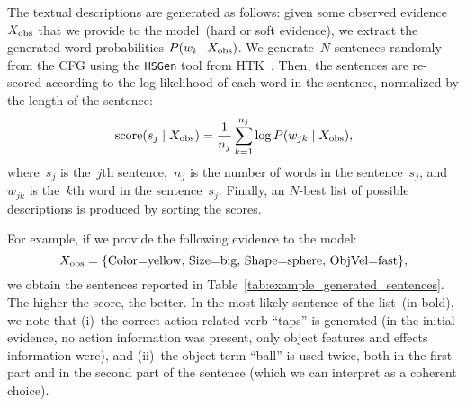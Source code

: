 The textual descriptions are generated as follows: given some observed evidence~$X_\text{obs}$ that we provide to the model~(hard or soft evidence), we extract the generated word probabilities
$P(w_i \mid X_\text{obs})$.
We generate~$N$ sentences randomly from the \ac{CFG} using the \texttt{HSGen} tool from HTK~\cite{young:htkbook}.
Then, the sentences are re-scored according to the log-likelihood of each word in the sentence, normalized by the length of the sentence:
\begin{equation} \label{eq:sentence_score}
  \text{score}(s_j \given \xobs) = \frac{1}{n_j} \sum_{k=1}^{n_j} \log P(w_{jk} \given \xobs),
\end{equation}
where~$s_j$ is the~$j$th sentence,~$n_j$ is the number of words in the sentence~$s_j$, and~$w_{jk}$ is the~$k$th word in the sentence~$s_j$.
Finally, an $N$-best list of possible descriptions is produced by sorting the scores.

For example, if we provide the following evidence to the model:
\begin{equation} \label{eq:evidence_example}
    \xobs = \{\text{Color=yellow, Size=big, Shape=sphere, ObjVel=fast}\},
\end{equation}
we obtain
the sentences reported in Table~\ref{tab:example_generated_sentences}.
The higher the score, the better.
In the most likely sentence of the list~(in bold), we note that (i)~the correct action-related verb ``taps'' is generated (in the initial evidence, no action information was present, only object features and effects information were), and (ii)~the object term ``ball'' is used twice, both in the first part and in the second part of the sentence (which we can interpret as a coherent choice).



